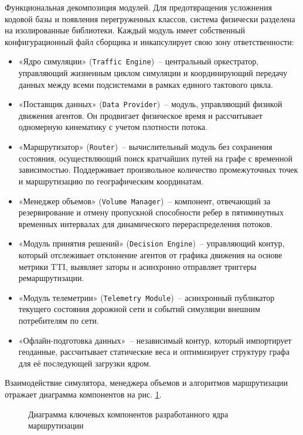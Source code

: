 Функциональная декомпозиция модулей.
Для предотвращения усложнения кодовой базы и появления перегруженных классов, система физически разделена на изолированные библиотеки. Каждый модуль имеет собственный конфигурационный файл сборщика и инкапсулирует свою зону ответственности:

\begin{itemize}
    \item «Ядро симуляции» (\texttt{Traffic Engine})~-- центральный оркестратор, управляющий жизненным циклом симуляции и координирующий передачу данных между всеми подсистемами в рамках единого тактового цикла.
    \item «Поставщик данных» (\texttt{Data Provider})~-- модуль, управляющий физикой движения агентов. Он продвигает физическое время и рассчитывает одномерную кинематику с учетом плотности потока.
    \item «Маршрутизатор» (\texttt{Router})~-- вычислительный модуль без сохранения состояния, осуществляющий поиск кратчайших путей на графе с временной зависимостью. Поддерживает произвольное количество промежуточных точек и маршрутизацию по географическим координатам.
    \item «Менеджер объемов» (\texttt{Volume Manager})~-- компонент, отвечающий за резервирование и отмену пропускной способности ребер в пятиминутных временных интервалах для динамического перераспределения потоков.
    \item «Модуль принятия решений» (\texttt{Decision Engine})~-- управляющий контур, который отслеживает отклонение агентов от графика движения на основе метрики TTI, выявляет заторы и асинхронно отправляет триггеры ремаршрутизации.
    \item «Модуль телеметрии» (\texttt{Telemetry Module})~-- асинхронный публикатор текущего состояния дорожной сети и событий симуляции внешним потребителям по сети.
    \item «Офлайн-подготовка данных»~-- независимый контур, который импортирует геоданные, рассчитывает статические веса и оптимизирует структуру графа для её последующей загрузки ядром.
\end{itemize}

Взаимодействие симулятора, менеджера объемов и алгоритмов маршрутизации отражает диаграмма компонентов на рис. \ref{fig:traffic_core}.

\begin{figure}[htbp]
    \centering
    
    \caption{Диаграмма ключевых компонентов разработанного ядра маршрутизации}
    \label{fig:traffic_core}
\end{figure}

